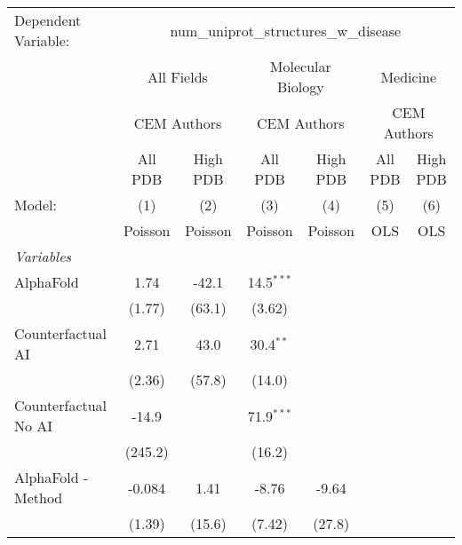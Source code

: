 \begingroup
\centering
\begin{tabular}{lcccccc}
   \tabularnewline \midrule \midrule
   Dependent Variable: & \multicolumn{6}{c}{num\_uniprot\_structures\_w\_disease}\\
 & \multicolumn{2}{c}{All Fields} & \multicolumn{2}{c}{Molecular Biology} & \multicolumn{2}{c}{Medicine} \\
\cmidrule(lr){2-3} \cmidrule(lr){4-5} \cmidrule(lr){6-7}
 & \multicolumn{2}{c}{CEM Authors} & \multicolumn{2}{c}{CEM Authors} & \multicolumn{2}{c}{CEM Authors} \\
\cmidrule(lr){2-3} \cmidrule(lr){4-5} \cmidrule(lr){6-7}
 & \multicolumn{1}{c}{All PDB} & \multicolumn{1}{c}{High PDB} & \multicolumn{1}{c}{All PDB} & \multicolumn{1}{c}{High PDB} & \multicolumn{1}{c}{All PDB} & \multicolumn{1}{c}{High PDB} \\
\cmidrule(lr){2-2} \cmidrule(lr){3-3} \cmidrule(lr){4-4} \cmidrule(lr){5-5} \cmidrule(lr){6-6} \cmidrule(lr){7-7}
   Model:                                                  & (1)         & (2)     & (3)           & (4)     & (5)  & (6)\\  
                                                           &  Poisson    & Poisson & Poisson       & Poisson & OLS  & OLS\\  
   \midrule
   \emph{Variables}\\
   AlphaFold                                               & 1.74        & -42.1   & 14.5$^{***}$  &         &      &   \\   
                                                           & (1.77)      & (63.1)  & (3.62)        &         &      &   \\   
   Counterfactual AI                                       & 2.71        & 43.0    & 30.4$^{**}$   &         &      &   \\   
                                                           & (2.36)      & (57.8)  & (14.0)        &         &      &   \\   
   Counterfactual No AI                                    & -14.9       &         & 71.9$^{***}$  &         &      &   \\   
                                                           & (245.2)     &         & (16.2)        &         &      &   \\   
   AlphaFold - Method                                      & -0.084      & 1.41    & -8.76         & -9.64   &      &   \\   
                                                           & (1.39)      & (15.6)  & (7.42)        & (27.8)  &      &   \\   

\end{tabular}
